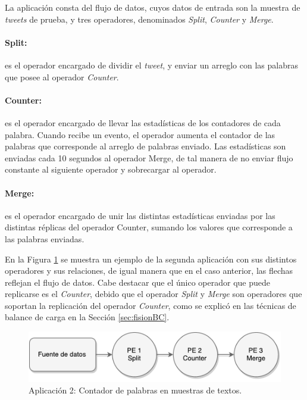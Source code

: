 La aplicación consta del flujo de datos, cuyos datos de entrada son la muestra de \textit{tweets} de prueba, y tres operadores, denominados \textit{Split}, \textit{Counter} y \textit{Merge}.

\paragraph{Split:} es el operador encargado de dividir el \textit{tweet}, y enviar un arreglo con las palabras que posee al operador \textit{Counter}.

\paragraph{Counter:} es el operador encargado de llevar las estadísticas de los contadores de cada palabra. Cuando recibe un evento, el operador aumenta el contador de las palabras que corresponde al arreglo de palabras enviado. Las estadísticas son enviadas cada 10 segundos al operador Merge, de tal manera de no enviar flujo constante al siguiente operador y sobrecargar al operador.

\paragraph{Merge:} es el operador encargado de unir las distintas estadísticas enviadas por las distintas réplicas del operador Counter, sumando los valores que corresponde a las palabras enviadas.

En la Figura \ref{fig:segundaAplicacion} se muestra un ejemplo de la segunda aplicación con sus distintos operadores y sus relaciones, de igual manera que en el caso anterior, las flechas reflejan el flujo de datos. Cabe destacar que el único operador que puede replicarse es el \textit{Counter}, debido que el operador \textit{Split} y \textit{Merge} son operadores que soportan la replicación del operador \textit{Counter}, como se explicó en las técnicas de balance de carga en la Sección \ref{sec:fisionBC}.

\begin{figure}[!ht]
	\centering
		\includegraphics[scale=0.6]{images/App2.pdf}
	\caption{Aplicación 2: Contador de palabras en muestras de textos.}
	\label{fig:segundaAplicacion}
\end{figure}

